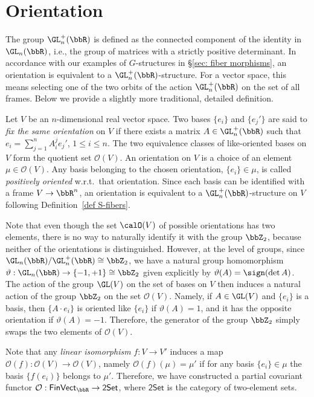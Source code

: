 \section{Orientation}

The group $\GL^+_n(\bbR )$ is defined as the connected component of the identity in $\GL_n(\bbR )$, i.e., the group of matrices with a strictly positive determinant. In accordance with our examples of $G$-structures in \S\ref{sec: fiber morphisms}, an orientation is equivalent to a $\GL_n^+(\bbR)$-structure. For a vector space, this means selecting one of the two orbits of the action $\GL_n^+(\bbR)$ on the set of all frames. Below we provide a slightly more traditional, detailed definition.

\begin{defn}
    Let $V$ be an $n$-dimensional real vector space. Two bases $\{e_i\}$ and $\{e_j'\}$ are said to \emph{fix the same orientation} on $V$ if there exists a matrix $A\in\GL^+_n(\bbR )$ such that $e_i=\sum_{j=1}^n A_i^j e_j'$, $1\leq i\leq n$. The two equivalence classes of like-oriented bases on $V$ form the quotient set $\mathcal{O}(V)$. An orientation on $V$ is a choice of an element $\mu\in\mathcal{O}(V)$. Any basis belonging to the chosen orientation, $\{e_i\}\in\mu$, is called \emph{positively oriented} w.r.t.\ that orientation. Since each basis can be identified with a frame $V\to \bbR^n$, an orientation is equivalent to a $\GL_n^+(\bbR)$-structure on $V$ following Definition~\ref{def S-fibers}.
\end{defn}

Note that even though the set $\calO(V)$ of possible orientations has two elements, there is no way to naturally identify it with the group $\bbZ_2$, because neither of the orientations is distinguished. However, at the level of groups, since $\GL_n(\bbR )\slash\GL^+_n(\bbR )\cong\bbZ_2$, we have a natural group homomorphism $\vartheta:\GL_n(\bbR )\to \{-1,+1\}\cong \bbZ_2$ given explicitly by $\vartheta(A)=\sign (\det A)$. The action of the group $\GL(V)$ on the set of bases on $V$ then induces a natural action of the group $\bbZ_2$ on the set $\mathcal{O}(V)$. Namely, if $A\in\GL(V)$ and $\{e_i\}$ is a basis, then $\{A\cdot e_i\}$ is oriented like $\{e_i\}$ if $\vartheta(A)=1$, and it has the opposite orientation if $\vartheta(A)=-1$. Therefore, the generator of the group $\bbZ_2$ simply swaps the two elements of $\mathcal{O}(V)$.

Note that any \emph{linear isomorphism} $f:V\to V'$ induces a map $\mathcal{O}(f):\mathcal{O}(V)\to\mathcal{O}(V)$, namely $\mathcal{O}(f)(\mu)=\mu'$ if for any basis $\{e_i\}\in\mu$ the basis $\{f(e_i)\}$ belongs to $\mu'$. Therefore, we have constructed a partial covariant functor $\mathcal{O}:\mathsf{FinVect}_\bbR \to\mathsf{2Set}$, where $\mathsf{2Set}$ is the category of two-element sets.

